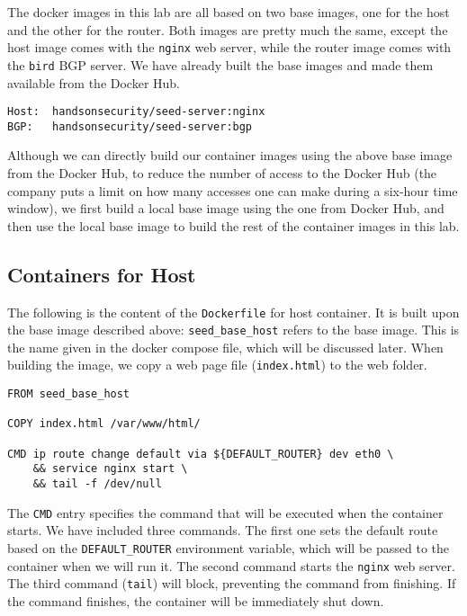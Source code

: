 The docker images in this lab are all based on two
base images, one for the host and the other 
for the router. Both images are pretty much the same,
except the host image comes with the \texttt{nginx}  
web server, while the router image comes with 
the \texttt{bird} BGP server. We have already built 
the base images and made them available 
from the Docker Hub. 

\begin{lstlisting}
Host:  handsonsecurity/seed-server:nginx
BGP:   handsonsecurity/seed-server:bgp
\end{lstlisting}


Although we can directly build our container images using 
the above base image from the Docker Hub, to reduce
the number of access to the Docker Hub (the company
puts a limit on how many accesses one can make 
during a six-hour time window), we first build a 
local base image using the one from Docker Hub, and then
use the local base image to build the rest of the 
container images in this lab. 
 

\subsection{Containers for Host} 

The following is the content of the \texttt{Dockerfile} for 
host container. It is built upon the base image 
described above: \texttt{seed\_base\_host} refers to the 
base image. This is the name given in 
the docker compose file, which will be discussed later.
When building the image, we copy a web page file (\texttt{index.html}) 
to the web folder. 

\begin{lstlisting}
FROM seed_base_host

COPY index.html /var/www/html/

CMD ip route change default via ${DEFAULT_ROUTER} dev eth0 \
    && service nginx start \
    && tail -f /dev/null
\end{lstlisting}


The \texttt{CMD} entry specifies the command that will be 
executed when the container starts. We have included 
three commands. The first one sets the default route based
on the \texttt{DEFAULT\_ROUTER} environment variable, 
which will be passed to the container when we will 
run it. The second command starts the \texttt{nginx}
web server. 
The third command (\texttt{tail})
will block, preventing the command from finishing. 
If the command finishes, the container will be 
immediately shut down. 



